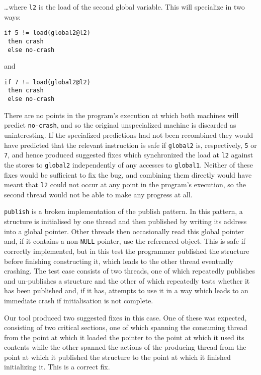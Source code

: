 \documentclass[10pt,twocolumn,preprint,natbib,authoryear]{sigplanconf}
\newcommand{\editorial}[1]{}
\begin{document}
\noindent
\ldots where \verb|l2| is the load of the second global variable.
This will specialize in two ways:

\begin{verbatim}
if 5 != load(global2@l2)
 then crash
 else no-crash
\end{verbatim}

and

\begin{verbatim}
if 7 != load(global2@l2)
 then crash
 else no-crash
\end{verbatim}

\noindent
There are no points in the program's execution at which both machines
will predict \verb|no-crash|, and so the original unspecialized
machine is discarded as uninteresting.  If the specialized predictions
had not been recombined they would have predicted that the relevant
instruction is safe if \verb|global2| is, respectively, \verb|5| or
\verb|7|, and hence produced suggested fixes which synchronized the
load at \verb|l2| against the stores to \verb|global2| independently
of any accesses to \verb|global1|.  Neither of these fixes would be
sufficient to fix the bug, and combining them directly would have
meant that \verb|l2| could not occur at any point in the program's
execution, so the second thread would not be able to make any progress
at all.

\verb|publish| is a broken implementation of the publish pattern.  In
this pattern, a structure is initialised by one thread and then
published by writing its address into a global pointer.  Other threads
then occasionally read this global pointer and, if it contains a
non-\verb|NULL| pointer, use the referenced object.\editorial{I'm
  convinced that this is a standard pattern, and that I didn't invent
  the term, but I can't find a reference.}  This is safe if correctly
implemented, but in this test the programmer published the structure
before finishing constructing it, which leads to the other thread
eventually crashing.  The test case consists of two threads, one of
which repeatedly publishes and un-publishes a structure and the other
of which repeatedly tests whether it has been published and, if it
has, attempts to use it in a way which leads to an immediate crash if
initialisation is not complete.

Our tool produced two suggested fixes in this case.  One of these was
expected, consisting of two critical sections, one of which spanning
the consuming thread from the point at which it loaded the pointer to
the point at which it used its contents while the other spanned the
actions of the producing thread from the point at which it published
the structure to the point at which it finished initializing it.  This
is a correct fix.
\end{document}
